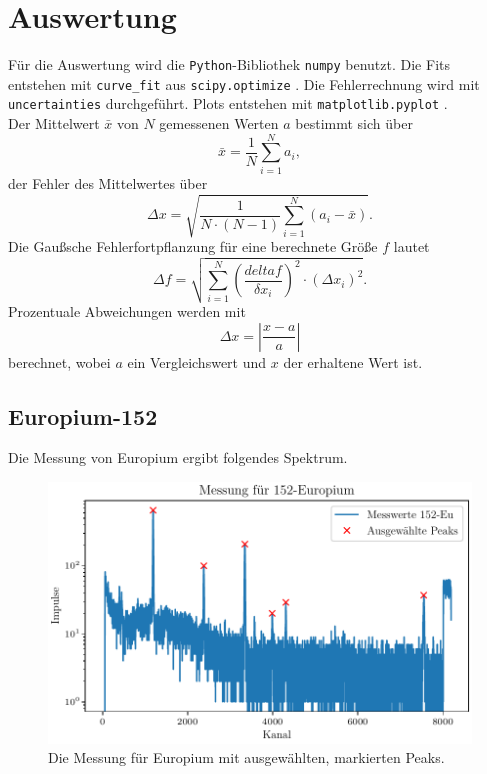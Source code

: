 \section{Auswertung}
\label{sec:Auswertung}

Für die Auswertung wird die \texttt{Python}-Bibliothek \texttt{numpy} \cite{numpy} benutzt. Die Fits entstehen mit \texttt{curve\_fit} aus \texttt{scipy.optimize} \cite{scipy}.
Die Fehlerrechnung wird mit \texttt{uncertainties} \cite{uncertainties} durchgeführt. Plots entstehen mit \texttt{matplotlib.pyplot} \cite{matplotlib}. \\
Der Mittelwert $\bar{x}$ von $N$ gemessenen Werten $a$ bestimmt sich über
\begin{equation}
    \bar{x} = \frac{1}{N} \sum^N_{i=1} a_i,
    \label{eq:mittelwerte}
\end{equation}
der Fehler des Mittelwertes über
\begin{equation}
    \Delta x = \sqrt{\frac{1}{N \cdot (N-1)} \sum^N_{i=1}(a_i - \bar{x})}.
    \label{eq:mittelwerte_fehler}
\end{equation}
Die Gaußsche Fehlerfortpflanzung für eine berechnete Größe $f$ lautet
\begin{equation}
    \Delta f = \sqrt{ \sum^N_{i=1} \left( \frac{delta f}{\delta x_i}\right)^2 \cdot (\Delta x_i)^2}.
\end{equation}
Prozentuale Abweichungen werden mit
\begin{equation}
    \Delta x = \left|\frac{x - a}{a}\right|
\end{equation}
berechnet, wobei $a$ ein Vergleichswert und $x$ der erhaltene Wert ist.
\subsection{Europium-152}

Die Messung von Europium ergibt folgendes Spektrum.

\begin{figure}[H]
    \centering
    \includegraphics[width=\textwidth]{plots/Europium.pdf}
    \caption{Die Messung für Europium mit ausgewählten, markierten Peaks.}
    \label{fig:Europium}
\end{figure}

